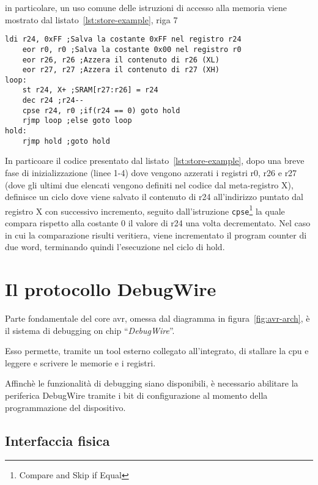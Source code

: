 in particolare, un uso comune delle istruzioni di accesso alla memoria viene mostrato dal listato~\ref{lst:store-example}, riga 7

\begin{lstlisting}[language=AVR, caption={Esempio di utilizzo dell'istruzione \texttt{st}}, label=lst:store-example]
    ldi r24, 0xFF ;Salva la costante 0xFF nel registro r24
    eor r0, r0 ;Salva la costante 0x00 nel registro r0
    eor r26, r26 ;Azzera il contenuto di r26 (XL)
    eor r27, r27 ;Azzera il contenuto di r27 (XH)
loop:
    st r24, X+ ;SRAM[r27:r26] = r24
    dec r24 ;r24--
    cpse r24, r0 ;if(r24 == 0) goto hold
    rjmp loop ;else goto loop
hold:
    rjmp hold ;goto hold

\end{lstlisting}

In particoare il codice presentato dal listato~\ref{lst:store-example}, dopo una breve fase di inizializzazione (linee 1-4) dove vengono azzerati i registri r0, r26 e r27 (dove gli ultimi due elencati vengono definiti nel codice dal meta-registro X), definisce un ciclo dove viene salvato il contenuto di r24 all'indirizzo puntato dal registro X con successivo incremento, seguito dall'istruzione \texttt{cpse}\footnote{Compare and Skip if Equal} la quale compara rispetto alla costante 0 il valore di r24 una volta decrementato. Nel caso in cui la comparazione risulti veritiera, viene incrementato il program counter di due word, terminando quindi l'esecuzione nel ciclo di hold.

\section{Il protocollo DebugWire}

Parte fondamentale del core avr, omessa dal diagramma in figura~\ref{fig:avr-arch}, è il sistema di debugging on chip ``\textit{DebugWire}''.

Esso permette, tramite un tool esterno collegato all'integrato, di stallare la cpu e leggere e scrivere le memorie e i registri.\cite{avr:m328p}

Affinchè le funzionalità di debugging siano disponibili, è necessario abilitare la periferica DebugWire tramite i bit di configurazione al momento della programmazione del dispositivo.

\subsection{Interfaccia fisica}

